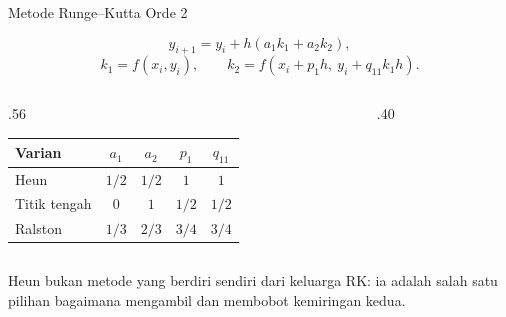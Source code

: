 \documentclass[aspectratio=169,10pt]{beamer}
\begin{document}
\begin{frame}{Metode Runge--Kutta Orde 2}
\scriptsize
\begin{bluebox}
\[
y_{i+1}=y_i+h(a_1k_1+a_2k_2),
\]
\[
k_1=f(x_i,y_i),\qquad
k_2=f(x_i+p_1h,\ y_i+q_{11}k_1h).
\]
\end{bluebox}
\begin{columns}[T,totalwidth=\textwidth]
\begin{column}{.56\textwidth}
\begin{tabularx}{\linewidth}{lcccc}
\toprule
Varian & $a_1$ & $a_2$ & $p_1$ & $q_{11}$\\
\midrule
Heun & $1/2$ & $1/2$ & $1$ & $1$\\
Titik tengah & $0$ & $1$ & $1/2$ & $1/2$\\
Ralston & $1/3$ & $2/3$ & $3/4$ & $3/4$\\
\bottomrule
\end{tabularx}
\end{column}
\begin{column}{.40\textwidth}
\end{column}
\end{columns}
\vspace{1mm}
\begin{goldbox}
Heun bukan metode yang berdiri sendiri dari keluarga RK: ia adalah salah satu pilihan bagaimana mengambil dan membobot kemiringan kedua.
\end{goldbox}
\end{frame}
\end{document}
